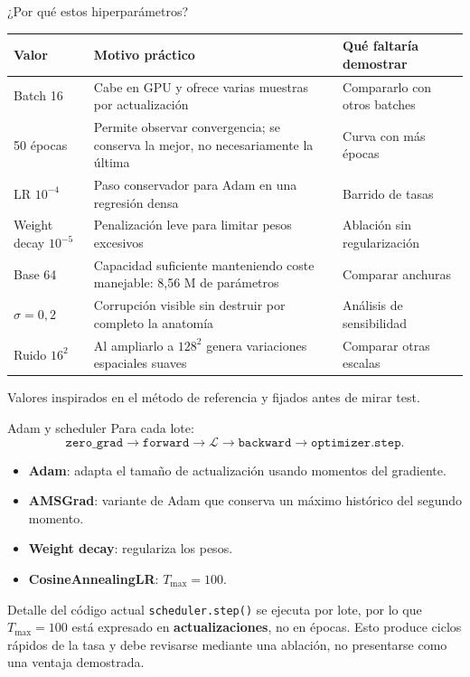 \documentclass[10pt,aspectratio=169]{beamer}
\begin{document}
\begin{frame}{¿Por qué estos hiperparámetros?}
  \small
  \begin{tabular}{p{2.7cm}p{6.1cm}p{3.0cm}}
    \toprule
    Valor & Motivo práctico & Qué faltaría demostrar \\
    \midrule
    Batch 16 & Cabe en GPU y ofrece varias muestras por actualización & Compararlo con otros batches \\
    50 épocas & Permite observar convergencia; se conserva la mejor, no necesariamente la última & Curva con más épocas \\
    LR $10^{-4}$ & Paso conservador para Adam en una regresión densa & Barrido de tasas \\
    Weight decay $10^{-5}$ & Penalización leve para limitar pesos excesivos & Ablación sin regularización \\
    Base 64 & Capacidad suficiente manteniendo coste manejable: 8,56 M de parámetros & Comparar anchuras \\
    $\sigma=0{,}2$ & Corrupción visible sin destruir por completo la anatomía & Análisis de sensibilidad \\
    Ruido $16^2$ & Al ampliarlo a $128^2$ genera variaciones espaciales suaves & Comparar otras escalas \\
    \bottomrule
  \end{tabular}

  \vspace{0.15cm}
  Valores inspirados en el método de referencia y fijados antes de mirar test.
\end{frame}

\begin{frame}{Adam y scheduler}
  Para cada lote:
  \[
    \texttt{zero\_grad}\rightarrow
    \texttt{forward}\rightarrow
    \mathcal L\rightarrow
    \texttt{backward}\rightarrow
    \texttt{optimizer.step}.
  \]

  \begin{itemize}
    \item \textbf{Adam}: adapta el tamaño de actualización usando momentos del gradiente.
    \item \textbf{AMSGrad}: variante de Adam que conserva un máximo histórico del segundo momento.
    \item \textbf{Weight decay}: regulariza los pesos.
    \item \textbf{CosineAnnealingLR}: $T_{\max}=100$.
  \end{itemize}

  \begin{alertblock}{Detalle del código actual}
    \texttt{scheduler.step()} se ejecuta por lote, por lo que $T_{\max}=100$
    está expresado en \textbf{actualizaciones}, no en épocas. Esto produce ciclos
    rápidos de la tasa y debe revisarse mediante una ablación, no presentarse
    como una ventaja demostrada.
  \end{alertblock}
\end{frame}
\end{document}
